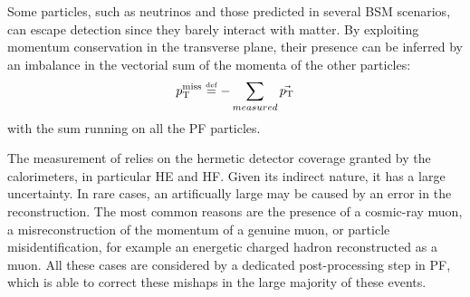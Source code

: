 \label{sec:MET}
Some particles, such as neutrinos and those predicted in several BSM scenarios, can escape detection since they barely interact with matter.
By exploiting momentum conservation in the transverse plane, their presence can be inferred by an imbalance in the vectorial sum of the momenta of the other particles:
\begin{equation}
  p_{\mathrm{T}}^\text{miss} \stackrel{\text{\tiny def}}{=} -\sum_{measured} \vec{p_{\mathrm{T}}}
\end{equation}
with the sum running on all the PF particles.

The measurement of \ptmiss relies on the hermetic detector coverage granted by the calorimeters, in particular HE and HF.
Given its indirect nature, it has a large uncertainty.
In rare cases, an artificually large \ptmiss may be caused by an error in the reconstruction. %
The most common reasons are the presence of a cosmic-ray muon,
a misreconstruction of the momentum of a genuine muon,
or particle misidentification, for example an energetic charged hadron reconstructed as a muon.
All these cases are considered by a dedicated post-processing step in PF,
which is able to correct these mishaps in the large majority of these events.
